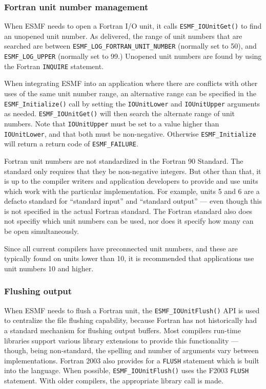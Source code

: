 

\subsubsection{Fortran unit number management} \label{fio:unitnumbers}

When ESMF needs to open a Fortran I/O unit, it calls {\tt ESMF\_IOUnitGet()} to find
an unopened unit number.  As delivered, the range of unit numbers that are
searched are between {\tt ESMF\_LOG\_FORTRAN\_UNIT\_NUMBER} (normally set to
50), and {\tt ESMF\_LOG\_UPPER} (normally set to 99.)
Unopened unit numbers are found by using the Fortran {\tt INQUIRE} statement.

When integrating ESMF into an application where there are conflicts with
other uses of the same unit number range, an alternative range can be specified
in the {\tt ESMF\_Initialize()} call by setting the {\tt IOUnitLower} and {\tt IOUnitUpper}
arguments as needed.  {\tt ESMF\_IOUnitGet()} will then search the alternate range
of unit numbers.  Note that {\tt IOUnitUpper} must be set to a value higher than
{\tt IOUnitLower}, and that both must be non-negative.  Otherwise {\tt ESMF\_Initialize}
will return a return code of {\tt ESMF\_FAILURE}.

Fortran unit numbers are not standardized in the Fortran 90 Standard.  The standard
only requires that they be non-negative integers.  But other than that, it is
up to the compiler writers and application developers to provide and
use units which work with the particular implementation.  For example,
units 5 and 6 are a defacto standard for ``standard input'' and
``standard output'' --- even though this is not specified in the actual Fortran
standard.  The Fortran standard also does not specifiy which unit numbers can
be used, nor does it specify how many can be open simultaneously.

Since all current compilers have preconnected unit numbers, and these are
typically found on units lower than 10, it is recommended that applications
use unit numbers 10 and higher.

\subsubsection{Flushing output}

When ESMF needs to flush a Fortran unit, the {\tt ESMF\_IOUnitFlush()} API is used
to centralize the file flushing capability, because Fortran has not historically
had a standard mechanism for flushing output buffers.  Most compilers run-time libraries
support various library extensions to provide this functionality --- though,
being non-standard, the spelling and number of arguments vary between implementations.
Fortran 2003 also provides for a {\tt FLUSH} statement which is built into the
language.  When possible, {\tt ESMF\_IOUnitFlush()} uses the F2003 {\tt FLUSH} statement.
With older compilers, the appropriate library call is made.
